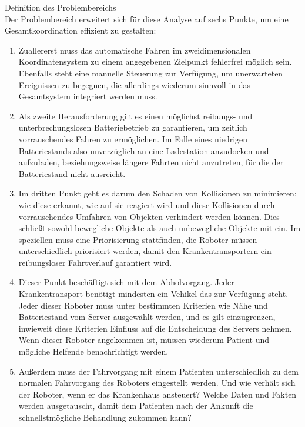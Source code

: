 Definition des Problembereichs\\
Der Problembereich erweitert sich für diese Analyse auf sechs Punkte, um eine Gesamtkoordination effizient zu gestalten:\\

\begin{enumerate}
	\item Zuallererst muss das automatische Fahren im zweidimensionalen Koordinatensystem zu einem angegebenen Zielpunkt fehlerfrei möglich sein. Ebenfalls steht eine manuelle Steuerung zur Verfügung, um unerwarteten Ereignissen zu begegnen, die allerdings wiederum sinnvoll in das Gesamtsystem integriert werden muss.
	\item Als zweite Herausforderung gilt es einen möglichst reibungs- und unterbrechungslosen Batteriebetrieb zu garantieren, um zeitlich vorrauschendes Fahren zu ermöglichen. Im Falle eines niedrigen Batteriestands also unverzüglich an eine Ladestation anzudocken und aufzuladen, beziehungsweise längere Fahrten nicht anzutreten, für die der Batteriestand nicht ausreicht.
	\item Im dritten Punkt geht es darum den Schaden von Kollisionen zu minimieren; wie diese erkannt, wie auf sie reagiert wird und diese Kollisionen durch vorrauschendes Umfahren von Objekten verhindert werden können. Dies schließt sowohl bewegliche Objekte als auch unbewegliche Objekte mit ein. Im speziellen muss eine Priorisierung stattfinden, die Roboter müssen unterschiedlich priorisiert werden, damit den Krankentransportern ein reibungsloser Fahrtverlauf garantiert wird.
	\item Dieser Punkt beschäftigt sich mit dem Abholvorgang. Jeder Krankentransport benötigt mindesten ein Vehikel das zur Verfügung steht. Jeder dieser Roboter muss unter bestimmten Kriterien wie Nähe und Batteriestand vom Server ausgewählt werden, und es gilt einzugrenzen, inwieweit diese Kriterien Einfluss auf die Entscheidung des Servers nehmen. Wenn dieser Roboter angekommen ist, müssen wiederum Patient und mögliche Helfende benachrichtigt werden.
	\item Außerdem muss der Fahrvorgang mit einem Patienten unterschiedlich zu dem normalen Fahrvorgang des Roboters eingestellt werden. Und wie verhält sich der Roboter, wenn er das Krankenhaus ansteuert? Welche Daten und Fakten werden ausgetauscht, damit dem Patienten nach der Ankunft die schnellstmögliche Behandlung zukommen kann?
\end{enumerate}

